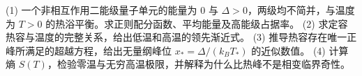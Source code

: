 (1) 一个非相互作用二能级量子单元的能量为 \(0\) 与 \(\Delta>0\)，两级均不简并，与温度为 \(T>0\) 的热浴平衡。求正则配分函数、平均能量及高能级占据率。
(2) 求定容热容与温度的完整关系，给出低温和高温的领先渐近式。
(3) 推导热容存在唯一正峰所满足的超越方程，给出无量纲峰位 \(x_*=\Delta/(k_BT_*)\) 的近似数值。
(4) 计算熵 \(S(T)\)，检验零温与无穷高温极限，并解释为什么比热峰不是相变临界奇性。
